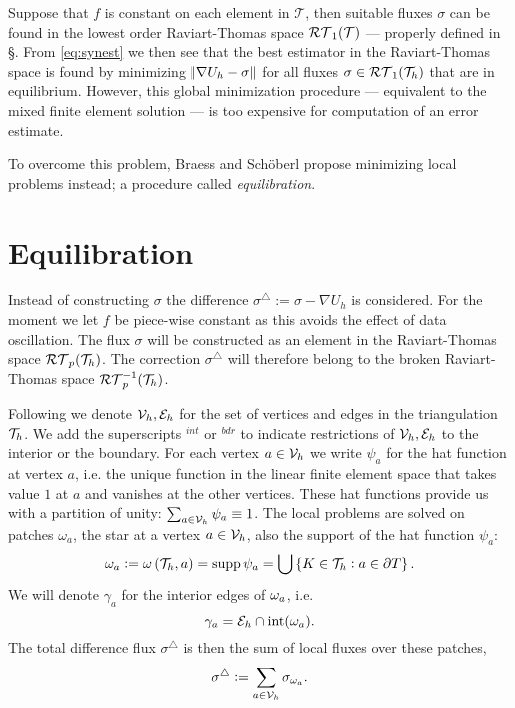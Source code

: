 \documentclass[thesis.tex]{subfiles}
\begin{document}
Suppose that $f$ is constant on each element in $\mathcal{T}$, then suitable fluxes $\sigma$ can be 
found in the lowest order Raviart-Thomas space $\mathcal{RT}_1(\mathcal{T})$ --- properly defined in \S {}.
From \eqref{eq:synest} we then see that 
the best estimator in the Raviart-Thomas space is found by minimizing $\norm{\nabla U_h - \sigma}$ for all 
fluxes $\sigma \in \mathcal{RT}_1(\mathcal{T}_h)$ that are in equilibrium. However,
this global minimization procedure --- equivalent to the mixed finite element solution --- 
is too expensive for computation of an error estimate.

To overcome this problem, Braess and Sch\"oberl \cite{braessequil} propose minimizing local problems instead; a procedure
called \emph{equilibration}.

\section{Equilibration} 
Instead of constructing $\sigma$ the difference $\sigma^\triangle := \sigma - \nabla U_h$ is considered.
For the moment we let  $f$ be piece-wise constant as this avoids the effect of data oscillation.
The flux $\sigma$ will be constructed as an element in the 
Raviart-Thomas space $\mathcal{RT}_p(\mathcal{T}_h)$. The correction $\sigma^\triangle$ will therefore belong to the broken Raviart-Thomas space $\mathcal{RT}_p^{-1}(\mathcal{T}_h)$.


Following \cite{ernequil} we denote $\mathcal{V}_h, \mathcal{E}_h$ for the set of vertices and edges in the triangulation~$\mathcal{T}_h$. 
We add the superscripts  $^{int}$ or $^{bdr}$ to indicate restrictions of $\mathcal{V}_h, \mathcal{E}_h$ to the interior or the boundary.
For each vertex $a \in \mathcal{V}_h$ we write $\psi_a$ for the hat function at vertex $a$, 
i.e. the unique function in the linear finite element space
that takes value $1$ at $a$ and vanishes at the other vertices.
These hat functions provide us with a partition of unity: $\sum_{a \in \mathcal{V}_h} \psi_a \equiv 1$.
The local problems are solved on patches $\omega_a$, the star at a vertex $a \in \mathcal{V}_h$, also the support of
the hat function $\psi_a$:
\[
  \omega_a := \omega\left( \mathcal{T}_h, a\right) = \operatorname{supp}{\psi_a} = \bigcup \set{ K \in \mathcal{T}_h : a \in \partial T}.
\]
We will denote $\gamma_a$ for the interior edges of $\omega_a$, i.e.
\[
  \gamma_a = \mathcal{E}_h \cap \text{int}(\omega_a).
\]
The total difference flux $\sigma^\triangle$ is then the sum of local fluxes over these patches, 
\[
  \sigma^\triangle := \sum_{a \in \mathcal{V}_h} \sigma_{\omega_a}.
\]
\end{document}
